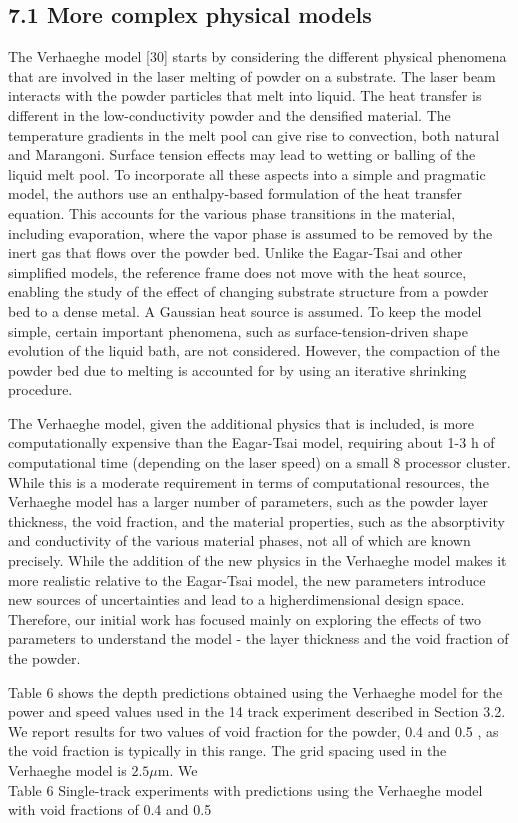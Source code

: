 \documentclass[10pt]{article}
\begin{document}
\subsection*{7.1 More complex physical models}
The Verhaeghe model [30] starts by considering the different physical phenomena that are involved in the laser melting of powder on a substrate. The laser beam interacts with the powder particles that melt into liquid. The heat transfer is different in the low-conductivity powder and the densified material. The temperature gradients in the melt pool can give rise to convection, both natural and Marangoni. Surface tension effects may lead to wetting or balling of the liquid melt pool. To incorporate all these aspects into a simple and pragmatic model, the authors use an enthalpy-based formulation of the heat transfer equation. This accounts for the various phase transitions in the material, including evaporation, where the vapor phase is assumed to be removed by the inert gas that flows over the powder bed. Unlike the Eagar-Tsai and other simplified models, the reference frame does not move with the heat source, enabling the study of the effect of changing substrate structure from a powder bed to a dense metal. A Gaussian heat source is assumed. To keep the model simple, certain important phenomena, such as surface-tension-driven shape evolution of the liquid bath, are not considered. However, the compaction of the powder bed due to melting is accounted for by using an iterative shrinking procedure.

The Verhaeghe model, given the additional physics that is included, is more computationally expensive than the Eagar-Tsai model, requiring about 1-3 $\mathrm{h}$ of computational time (depending on the laser speed) on a small 8 processor cluster. While this is a moderate requirement in terms of computational resources, the Verhaeghe model has a larger number of parameters, such as the powder layer thickness, the void fraction, and the material properties, such as the absorptivity and conductivity of the various material phases, not all of which are known precisely. While the addition of the new physics in the Verhaeghe model makes it more realistic relative to the Eagar-Tsai model, the new parameters introduce new sources of uncertainties and lead to a higherdimensional design space. Therefore, our initial work has focused mainly on exploring the effects of two parameters to understand the model - the layer thickness and the void fraction of the powder.

Table 6 shows the depth predictions obtained using the Verhaeghe model for the power and speed values used in the 14 track experiment described in Section 3.2. We report results for two values of void fraction for the powder, 0.4 and 0.5 , as the void fraction is typically in this range. The grid spacing used in the Verhaeghe model is $2.5 \mu \mathrm{m}$. We\\
Table 6 Single-track experiments with predictions using the Verhaeghe model with void fractions of 0.4 and 0.5
\end{document}
